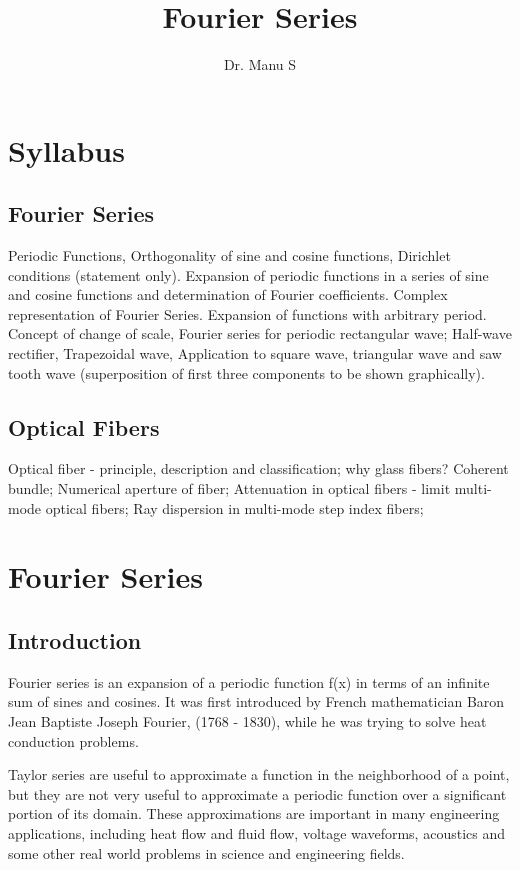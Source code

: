\documentclass[a4paper,12pt,twoside]{report}
\title{Fourier Series}
\author{Dr. Manu S}
\date{}
\begin{document}
\maketitle
\tableofcontents

\chapter*{Syllabus}
\section*{Fourier Series}
Periodic Functions, Orthogonality of sine and cosine functions, Dirichlet conditions (statement only). Expansion of periodic functions in a series of sine and cosine functions and determination of Fourier coefficients. Complex representation of Fourier Series. Expansion of functions with arbitrary period. Concept of change of scale, Fourier series for periodic rectangular wave; Half-wave rectifier, Trapezoidal wave, Application to square wave, triangular wave and saw tooth wave (superposition of first three components to be shown graphically). 

\section*{Optical Fibers}
Optical fiber - principle, description and classification; why glass fibers? Coherent bundle; Numerical aperture of fiber; Attenuation in optical fibers - limit multi-mode optical fibers; Ray dispersion in multi-mode step index fibers;



\chapter{Fourier Series}

\section{Introduction}
Fourier series is an expansion of a periodic function f(x) in terms of an infinite sum of sines and cosines.  It was first introduced by French mathematician Baron Jean Baptiste Joseph Fourier, (1768 - 1830), while he was trying to solve heat conduction problems.  

Taylor series are useful to approximate a function in the neighborhood of a point, but they are not very useful to approximate a periodic function over a significant portion of its domain.  These approximations are important in many engineering applications, including heat flow and fluid flow, voltage waveforms, acoustics and some other real world problems in science and engineering fields.
\end{document}
